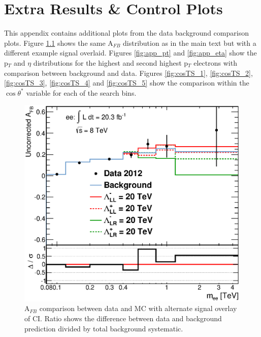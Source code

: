 \chapter{Extra Results \& Control Plots}
	\label{ap:contol}

	This appendix contains additional plots from the data background comparison plots. Figure \ref{fig:afb_alt} shows the same A$_{FB}$ distribution as in the main text but with a different example signal overlaid. Figures \ref{fig:app_pt} and \ref{fig:app_eta} show the p$_{T}$ and $\eta$ distributions for the highest and second highest p$_{T}$ electrons with comparison between background and data. Figures \ref{fig:cosTS_1}, \ref{fig:cosTS_2}, \ref{fig:cosTS_3}, \ref{fig:cosTS_4} and \ref{fig:cosTS_5} show the comparison within the $\cos{\theta^{*}}$ variable for each of the search bins.


	\begin{figure}[ht]
		\centering
			\includegraphics[width=0.98\linewidth]{images/AFB_main_alt.eps}
		\caption{A$_{FB}$ comparison between data and MC with alternate signal overlay of CI. Ratio shows the difference between data and background prediction divided by total background systematic.}
		\label{fig:afb_alt}
	\end{figure}








